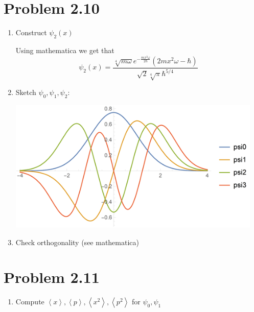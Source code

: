 \documentclass{article}
\newcommand{\braket}[1]{\left\langle #1 \right\rangle}
\newenvironment{problem}{\begin{enumerate}[label=(\alph*)]}{\end{enumerate}}
\begin{document}
\section*{Problem 2.10}

  \begin{problem}
    \item Construct $\psi_2(x)$
      
      Using mathematica we get that 
      $$ \psi_2(x) = \frac{\sqrt[4]{m \omega } e^{-\frac{m x^2 \omega }{2 \hbar }} \left(2 m x^2 \omega -\hbar \right)}{\sqrt{2} \sqrt[4]{\pi } \hbar ^{5/4}} $$

    \item Sketch $\psi_0, \psi_1, \psi_2$:

      \centerline{\includegraphics[height=2.5in]{2-10b-psis.png}}

    \item Check orthogonality (see mathematica)
  \end{problem}

\section*{Problem 2.11}

  \begin{problem}
    \item Compute $\braket{x}, \braket{p}, \braket{x^2}, \braket{p^2}$ for $\psi_0, \psi_1$


  \end{problem}
\end{document}
